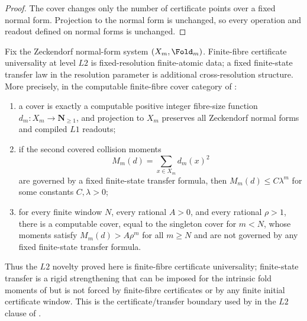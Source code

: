 \begin{proof}
The cover changes only the number of certificate points over a fixed normal
form.  Projection to the normal form is unchanged, so every operation and
readout defined on normal forms is unchanged.
\end{proof}

\begin{theorem}
\label{thm:L2-finite-state-novelty-spine}
Fix the Zeckendorf normal-form system \((X_m,\Fold_m)\).  Finite-fibre
certificate universality at level \(L2\) is fixed-resolution finite-atomic data;
a fixed finite-state transfer law in the resolution parameter is additional
cross-resolution structure.  More precisely, in the computable finite-fibre
cover category of :
\begin{enumerate}
\item a cover is exactly a computable positive integer fibre-size function
  \(d_m:X_m\to\mathbf N_{\ge1}\), and projection to \(X_m\) preserves all
  Zeckendorf normal forms and compiled \(L1\) readouts;
\item if the second covered collision moments
  \[
    M_m(d)=\sum_{x\in X_m} d_m(x)^2
  \]
  are governed by a fixed finite-state transfer formula, then
  \(M_m(d)\le C\lambda^m\) for some constants \(C,\lambda>0\);
\item for every finite window \(N\), every rational \(A>0\), and every rational
  \(\rho>1\), there is a computable cover, equal to the singleton cover for
  \(m<N\), whose moments satisfy \(M_m(d)>A\rho^m\) for all \(m\ge N\) and are
  not governed by any fixed finite-state transfer formula.
\end{enumerate}
Thus the \(L2\) novelty proved here is finite-fibre certificate universality;
finite-state transfer is a rigid strengthening that can be imposed for the
intrinsic fold moments of  but is not
forced by finite-fibre certificates or by any finite initial certificate window.
This is the certificate/transfer boundary used by
 in the
\(L2\) clause of .
\end{theorem}

